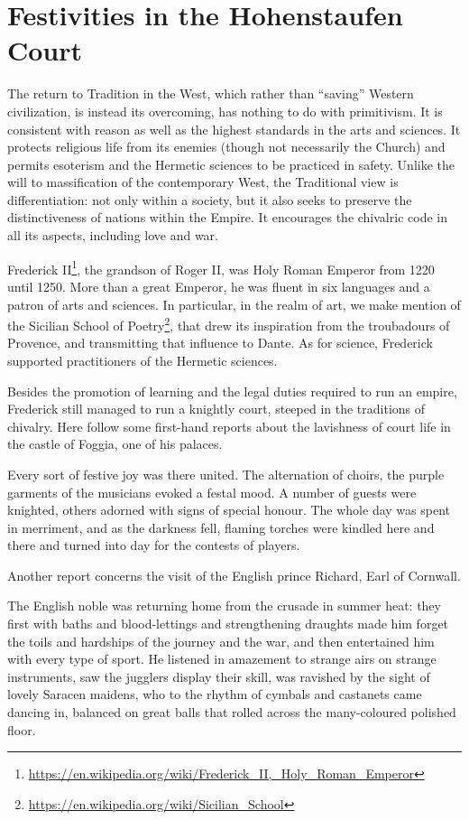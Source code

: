 \section{Festivities in the Hohenstaufen Court}

The return to Tradition in the West, which rather than ``saving'' Western civilization, is instead its overcoming, has nothing to do with primitivism. It is consistent with reason as well as the highest standards in the arts and sciences. It protects religious life from its enemies (though not necessarily the Church) and permits esoterism and the Hermetic sciences to be practiced in safety. Unlike the will to massification of the contemporary West, the Traditional view is differentiation: not only within a society, but it also seeks to preserve the distinctiveness of nations within the Empire. It encourages the chivalric code in all its aspects, including love and war.

Frederick II\footnote{\url{https://en.wikipedia.org/wiki/Frederick\_II,\_Holy\_Roman\_Emperor}}, the grandson of Roger II, was Holy Roman Emperor from 1220 until 1250. More than a great Emperor, he was fluent in six languages and a patron of arts and sciences. In particular, in the realm of art, we make mention of the Sicilian School of Poetry\footnote{\url{https://en.wikipedia.org/wiki/Sicilian\_School}}, that drew its inspiration from the troubadours of Provence, and transmitting that influence to Dante. As for science, Frederick supported practitioners of the Hermetic sciences.

Besides the promotion of learning and the legal duties required to run an empire, Frederick still managed to run a knightly court, steeped in the traditions of chivalry. Here follow some first-hand reports about the lavishness of court life in the castle of Foggia, one of his palaces.

\begin{quotex}
Every sort of festive joy was there united. The alternation of choirs, the purple garments of the musicians evoked a festal mood. A number of guests were knighted, others adorned with signs of special honour. The whole day was spent in merriment, and as the darkness fell, flaming torches were kindled here and there and turned into day for the contests of players.
\end{quotex}


Another report concerns the visit of the English prince Richard, Earl of Cornwall.

\begin{quotex}
The English noble was returning home from the crusade in summer heat: they first with baths and blood-lettings and strengthening draughts made him forget the toils and hardships of the journey and the war, and then entertained him with every type of sport. He listened in amazement to strange airs on strange instruments, saw the jugglers display their skill, was ravished by the sight of lovely Saracen maidens, who to the rhythm of cymbals and castanets came dancing in, balanced on great balls that rolled across the many-coloured polished floor.
\end{quotex}


